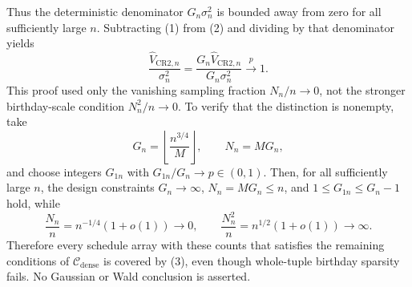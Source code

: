 Thus the deterministic denominator \(G_n\sigma_n^2\) is bounded away from zero for all sufficiently large \(n\).  Subtracting (1) from (2) and dividing by that denominator yields
\[
 \frac{\widehat V_{\mathrm{CR2},n}}{\sigma_n^2}
 =\frac{G_n\widehat V_{\mathrm{CR2},n}}{G_n\sigma_n^2}
 \xrightarrow{p}1.
 \tag{3}
\]
This proof used only the vanishing sampling fraction \(N_n/n\to0\), not the stronger birthday-scale condition \(N_n^2/n\to0\).  To verify that the distinction is nonempty, take
\[
 G_n=\left\lfloor\frac{n^{3/4}}M\right\rfloor,
 \qquad
 N_n=MG_n,
\]
and choose integers \(G_{1n}\) with \(G_{1n}/G_n\to p\in(0,1)\).  Then, for all sufficiently large \(n\), the design constraints \(G_n\to\infty\), \(N_n=MG_n\le n\), and \(1\le G_{1n}\le G_n-1\) hold, while
\[
 \frac{N_n}{n}=n^{-1/4}(1+o(1))\to0,
 \qquad
 \frac{N_n^2}{n}=n^{1/2}(1+o(1))\to\infty.
\]
Therefore every schedule array with these counts that satisfies the remaining conditions of \(\mathcal C_{\mathrm{dense}}\) is covered by (3), even though whole-tuple birthday sparsity fails.  No Gaussian or Wald conclusion is asserted.
